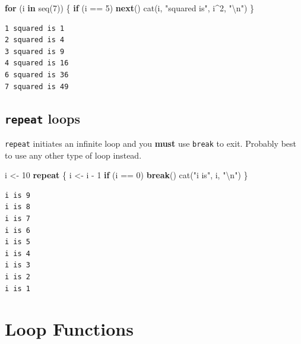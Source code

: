 \documentclass[
]{book}
\newenvironment{Shaded}{\begin{snugshade}}{\end{snugshade}}
\newcommand{\ControlFlowTok}[1]{\textcolor[rgb]{0.13,0.29,0.53}{\textbf{#1}}}
\newcommand{\DecValTok}[1]{\textcolor[rgb]{0.00,0.00,0.81}{#1}}
\newcommand{\FunctionTok}[1]{\textcolor[rgb]{0.00,0.00,0.00}{#1}}
\newcommand{\NormalTok}[1]{#1}
\newcommand{\OtherTok}[1]{\textcolor[rgb]{0.56,0.35,0.01}{#1}}
\newcommand{\SpecialCharTok}[1]{\textcolor[rgb]{0.00,0.00,0.00}{#1}}
\newcommand{\StringTok}[1]{\textcolor[rgb]{0.31,0.60,0.02}{#1}}
\begin{document}
\begin{Shaded}
\begin{Highlighting}[]
\ControlFlowTok{for}\NormalTok{ (i }\ControlFlowTok{in} \FunctionTok{seq}\NormalTok{(}\DecValTok{7}\NormalTok{)) \{}
  \ControlFlowTok{if}\NormalTok{ (i }\SpecialCharTok{==} \DecValTok{5}\NormalTok{) }\ControlFlowTok{next}\NormalTok{()}
  \FunctionTok{cat}\NormalTok{(i, }\StringTok{"squared is"}\NormalTok{, i}\SpecialCharTok{\^{}}\DecValTok{2}\NormalTok{, }\StringTok{"}\SpecialCharTok{\textbackslash{}n}\StringTok{"}\NormalTok{)}
\NormalTok{\}}
\end{Highlighting}
\end{Shaded}

\begin{verbatim}
1 squared is 1 
2 squared is 4 
3 squared is 9 
4 squared is 16 
6 squared is 36 
7 squared is 49 
\end{verbatim}

\hypertarget{repeat-loops}{%
\section{\texorpdfstring{\texttt{repeat} loops}{repeat loops}}\label{repeat-loops}}

\texttt{repeat} initiates an infinite loop and you \textbf{must} use \texttt{break} to exit. Probably best to use any other type of loop instead.

\begin{Shaded}
\begin{Highlighting}[]
\NormalTok{i }\OtherTok{\textless{}{-}} \DecValTok{10}
\ControlFlowTok{repeat}\NormalTok{ \{}
\NormalTok{ i }\OtherTok{\textless{}{-}}\NormalTok{ i }\SpecialCharTok{{-}} \DecValTok{1}
 \ControlFlowTok{if}\NormalTok{ (i }\SpecialCharTok{==} \DecValTok{0}\NormalTok{) }\ControlFlowTok{break}\NormalTok{()}
 \FunctionTok{cat}\NormalTok{(}\StringTok{"i is"}\NormalTok{, i, }\StringTok{"}\SpecialCharTok{\textbackslash{}n}\StringTok{"}\NormalTok{)}
\NormalTok{\}}
\end{Highlighting}
\end{Shaded}

\begin{verbatim}
i is 9 
i is 8 
i is 7 
i is 6 
i is 5 
i is 4 
i is 3 
i is 2 
i is 1 
\end{verbatim}

\hypertarget{loopfns}{%
\chapter{Loop Functions}\label{loopfns}}
\end{document}
